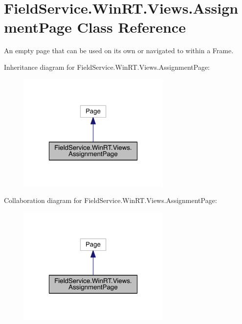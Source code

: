 \hypertarget{class_field_service_1_1_win_r_t_1_1_views_1_1_assignment_page}{\section{Field\+Service.\+Win\+R\+T.\+Views.\+Assignment\+Page Class Reference}
\label{class_field_service_1_1_win_r_t_1_1_views_1_1_assignment_page}
}


An empty page that can be used on its own or navigated to within a Frame.  




Inheritance diagram for Field\+Service.\+Win\+R\+T.\+Views.\+Assignment\+Page\+:
\nopagebreak
\begin{figure}[H]
\begin{center}
\leavevmode
\includegraphics[width=214pt]{class_field_service_1_1_win_r_t_1_1_views_1_1_assignment_page__inherit__graph}
\end{center}
\end{figure}


Collaboration diagram for Field\+Service.\+Win\+R\+T.\+Views.\+Assignment\+Page\+:
\nopagebreak
\begin{figure}[H]
\begin{center}
\leavevmode
\includegraphics[width=214pt]{class_field_service_1_1_win_r_t_1_1_views_1_1_assignment_page__coll__graph}
\end{center}
\end{figure}
